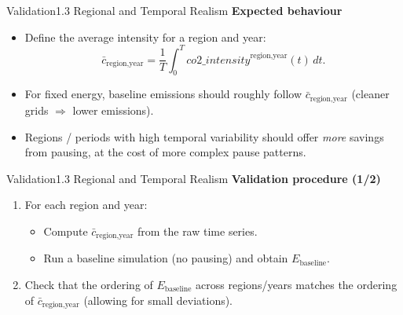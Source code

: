 \begin{frame}{Validation}{1.3 Regional and Temporal Realism}
  \textbf{Expected behaviour}
  \begin{itemize}
    \item Define the average intensity for a region and year:
      \[
        \bar{c}_{\text{region,year}} =
        \frac{1}{T} \int_0^T \mathit{co2\_intensity}^{\text{region,year}}(t)\, dt.
      \]
    \item For fixed energy, baseline emissions should roughly follow
      $\bar{c}_{\text{region,year}}$ (cleaner grids $\Rightarrow$ lower emissions).
    \item Regions / periods with high temporal variability should offer
      \emph{more} savings from pausing, at the cost of more complex pause patterns.
  \end{itemize}
\end{frame}

\begin{frame}{Validation}{1.3 Regional and Temporal Realism}
  \textbf{Validation procedure (1/2)}
  \begin{enumerate}
    \item For each region and year:
      \begin{itemize}
        \item Compute $\bar{c}_{\text{region,year}}$ from the raw time series.
        \item Run a baseline simulation (no pausing) and obtain $E_{\text{baseline}}$.
      \end{itemize}
    \item Check that the ordering of $E_{\text{baseline}}$ across regions/years
          matches the ordering of $\bar{c}_{\text{region,year}}$
          (allowing for small deviations).
  \end{enumerate}
\end{frame}

